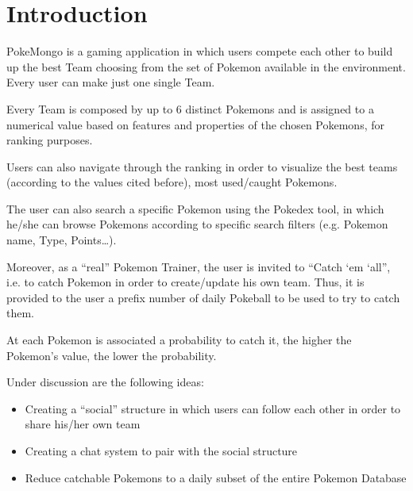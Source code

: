 \chapter{Introduction}
PokeMongo is a gaming application in which users compete each other to build up the best Team choosing from the set of Pokemon available in the environment. Every user can make just one single Team. 

Every Team is composed by up to 6 distinct Pokemons and is assigned to a numerical value based on features and properties of the chosen Pokemons, for ranking purposes.

Users can also navigate through the ranking in order to visualize the best teams (according to the values cited before), most used/caught Pokemons.

The user can also search a specific Pokemon using the Pokedex tool, in which he/she can browse Pokemons according to specific search filters (e.g. Pokemon name, Type, Points…).

Moreover, as a “real” Pokemon Trainer, the user is invited to “Catch ‘em ‘all”, i.e. to catch Pokemon in order to create/update his own team. Thus, it is provided to the user a prefix number of daily Pokeball to be used to try to catch them. 

At each Pokemon is associated a probability to catch it, the higher the Pokemon’s value, the lower the probability.

Under discussion are the following ideas:
\begin{itemize}
    \item Creating a “social” structure in which users can follow each other in order to share his/her own team
    \item Creating a chat system to pair with the social structure 
    \item Reduce catchable Pokemons to a daily subset of the entire Pokemon Database
\end{itemize} 